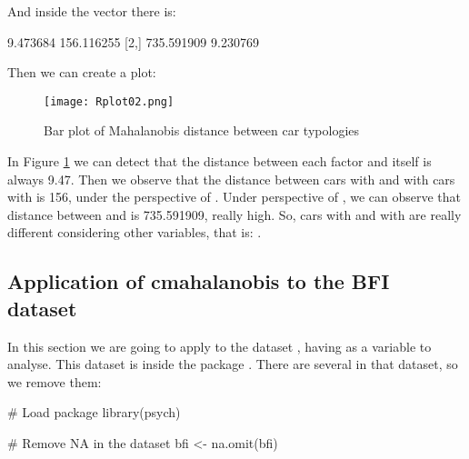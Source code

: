 \documentclass[article]{jss}
\begin{document}
And inside the vector  there is:
\begin{Code}
           [,1]       [,2]
[1,]   9.473684 156.116255
[2,] 735.591909   9.230769
\end{Code}

Then we can create a plot:
\begin{CodeChunk}
\end{CodeChunk}

\begin{figure}
    \centering
    \texttt{[image: Rplot02.png]}
    \caption{Bar plot of Mahalanobis distance between car typologies}
    \label{fig:barplot2}
\end{figure}

In Figure \ref{fig:barplot2} we can detect that the distance between each factor and itself is always 9.47. Then we observe that the distance between cars with  and with cars with  is 156, under the perspective of . Under perspective of , we can observe that distance between  and  is 735.591909, really high. So, cars with  and with  are really different considering other variables, that is: \cite{Mahalanobis1936, rdocumentation}.

\subsection{Application of cmahalanobis to the BFI dataset}\label{Application of cmahalanobis to the BFI dataset}
In this section we are going to apply  to the dataset , having  as a variable to analyse. This dataset is inside the package . There are several  in that dataset, so we remove them: 
\begin{CodeChunk}
\begin{CodeInput}
# Load package
library(psych)

# Remove NA in the dataset
bfi <- na.omit(bfi)
\end{CodeInput}
\end{CodeChunk}
\end{document}

